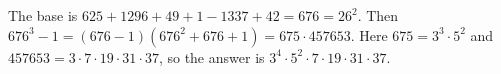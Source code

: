 The base is $625+1296+49+1-1337+42=676=26^2$. Then $676^3-1=(676-1)(676^2+676+1)=675\cdot457653$. Here $675=3^3\cdot5^2$ and $457653=3\cdot7\cdot19\cdot31\cdot37$, so the answer is $\boxed{3^4\cdot5^2\cdot7\cdot19\cdot31\cdot37}$.
